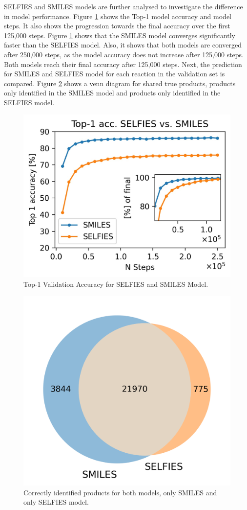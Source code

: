 \documentclass[10pt,conference,compsocconf]{IEEEtran}
\begin{document}
SELFIES and SMILES models are further analysed to investigate the difference in model performance. Figure \ref{fig:top1} shows the Top-1 model accuracy and model steps. It also shows the progression towards the final accuracy over the first 125,000 steps. Figure \ref{fig:top1} shows that the SMILES model converges significantly faster than the SELFIES model. Also, it shows that both models are converged after 250,000 steps, as the model accuracy does not increase after 125,000 steps. Both models reach their final accuracy after 125,000 steps. Next, the prediction for SMILES and SELFIES model for each reaction in the validation set is compared. Figure \ref{fig:Venn} shows a venn diagram for shared true products, products only identified in the SMILES model and products only identified in the SELFIES model.\\
\begin{figure}[h]
    \centering
    \includegraphics[width = .8\linewidth]{figures/accuracy.jpeg}
    \caption{Top-1 Validation Accuracy for SELFIES and SMILES Model.}
    \label{fig:top1}
\end{figure} 

\begin{figure}[h]
    \centering
    \includegraphics[width = .7\linewidth]{./figures/venn.png}
    \caption{Correctly identified products for both models, only SMILES and only SELFIES model.}
    \label{fig:Venn}
\end{figure} 
\end{document}
